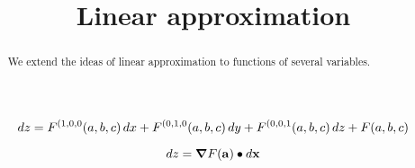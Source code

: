 \documentclass{ximera}
\title[Dig-In:]{Linear approximation}
\begin{document}
\begin{abstract}
  We extend the ideas of linear approximation to functions of several
  variables.
\end{abstract}
\maketitle




\[
\mathop{}\!d z = F^{(1,0,0}(a,b,c)\mathop{}\!d x + F^{(0,1,0}(a,b,c)\mathop{}\!d y+ F^{(0,0,1}(a,b,c)\mathop{}\!d z + F(a,b,c)
\]

\[
\mathop{}\!d z = \boldsymbol\nabla F(\mathbf{a}) \bullet \mathop{}\!d \mathbf{x}
\]
\end{document}
